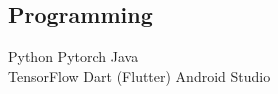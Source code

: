 \documentclass[letterpaper]{deedy-resume} %
\begin{document}
\begin{minipage}[t]{0.33\textwidth}

\subsection{Programming}

Python \textbullet{} Pytorch \textbullet{} Java \\
\textbullet{} TensorFlow \textbullet{} Dart (Flutter) \textbullet{} Android Studio

\sectionspace %

\end{minipage} %
\hfill
%
%
\end{document}
